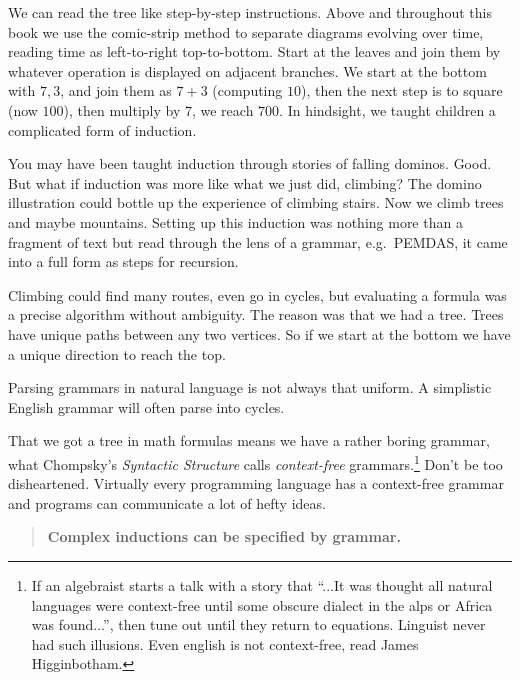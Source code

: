 We can read the tree like step-by-step instructions. Above and 
throughout this book we use the comic-strip method to separate diagrams 
evolving over time, reading time as left-to-right top-to-bottom.  Start at the leaves and join
them by whatever operation is displayed on adjacent branches.
We start at the bottom with $7,3$, and join them as $7+3$ (computing $10$),
then the next step is to square (now $100$), then multiply by $7$, we reach $700$.
In hindsight, we taught children a complicated form of induction.

You may have been taught induction through stories of falling 
dominos.  Good.  But what if induction was more like what we just did, climbing?
The domino illustration could bottle up the experience of climbing stairs.  
Now we climb trees and maybe mountains.
Setting up this induction was nothing more than a fragment of text but 
read through the lens of a grammar, e.g.\ PEMDAS, it came into a full form
as steps for recursion.

Climbing could find many routes, even go in cycles, but 
evaluating a formula was a precise algorithm without ambiguity.
The reason was that we had a tree.  Trees have unique paths between 
any two vertices. So if we start at the bottom we have a unique direction to 
reach the top. 

Parsing grammars in natural language is not always that
uniform.  A simplistic English grammar will often parse into cycles.
\begin{center}
\end{center}


That we got a tree in math formulas means we have a rather boring grammar, 
what Chompsky's \emph{Syntactic Structure} calls
\emph{context-free} grammars.\footnote{
    If an algebraist starts a talk with a story that ``...It was thought  all natural 
    languages were context-free until some obscure dialect in the alps or Africa was found...'', 
    then tune out until they return to equations.  
    Linguist never had such illusions. Even english is not context-free, read  James Higginbotham.} 
Don't be too disheartened.  Virtually every programming language has a 
context-free grammar and programs can communicate a lot of hefty ideas. 

\begin{quote}
    \textbf{Complex inductions can be specified by grammar.}
\end{quote}
